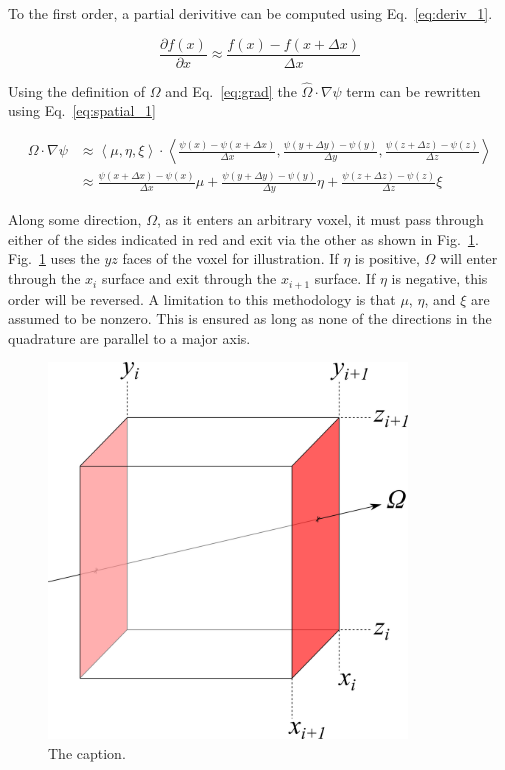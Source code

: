 To the first order, a partial derivitive can be computed using Eq.~\ref{eq:deriv_1}.

\begin{equation} \label{eq:deriv_1}
\frac{\partial f(x)}{\partial x} \approx \frac{f(x) - f(x + \Delta x)}{\Delta x}
\end{equation}

Using the definition of $\Omega$ and Eq.~\ref{eq:grad} the $\hat{\Omega} \cdot \nabla \psi$ term can be rewritten using Eq.~\ref{eq:spatial_1}

\begin{equation} \label{eq:deriv_1}
\begin{split}
\Omega \cdot \nabla \psi & \approx 
\left\langle \mu, \eta, \xi \right\rangle \cdot
\left\langle \frac{\psi(x) - \psi(x + \Delta x)}{\Delta x},
\frac{\psi(y + \Delta y) - \psi(y)}{\Delta y},
\frac{\psi(z + \Delta z) - \psi(z)}{\Delta z} \right\rangle \\
& \approx 
\frac{\psi(x + \Delta x) - \psi(x)}{\Delta x} \mu + 
\frac{\psi(y + \Delta y) - \psi(y)}{\Delta y} \eta + 
\frac{\psi(z + \Delta z) - \psi(z)}{\Delta z} \xi
\end{split}
\end{equation}

Along some direction, $\Omega$, as it enters an arbitrary voxel, it must pass through either of the sides indicated in red and exit via the other as shown in Fig.~\ref{fig:gradient}. Fig.~\ref{fig:gradient} uses the $yz$ faces of the voxel for illustration. If $\eta$ is positive, $\Omega$ will enter through the $x_i$ surface and exit through the $x_{i+1}$ surface. If $\eta$ is negative, this order will be reversed. A limitation to this methodology is that $\mu$, $\eta$, and $\xi$ are assumed to be nonzero. This is ensured as long as none of the directions in the quadrature are parallel to a major axis.

\begin{figure}[tb]
  \begin{center}
   \includegraphics[width=3.75in]{figs/gradient}
  \end{center}
  \caption{The caption.}
\label{fig:gradient}
\end{figure}%

